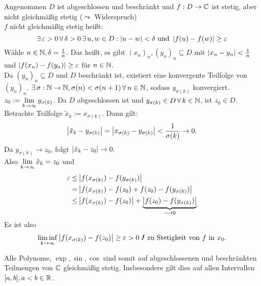 \documentclass[../ana1.tex]{subfiles}
\begin{document}
\begin{bew}
    Angenommen \(D\) ist abgeschlossen und beschränkt und
    \( f: D \rightarrow \mathbb{C} \) ist stetig, aber nicht gleichmäßig
    stetig (\( \leadsto \) Widerspruch)\\
    \( f \) nicht gleichmäßig stetig heißt:
    \[ \exists \, \varepsilon > 0 \,\forall \, 
    \delta > 0 \,\exists \, u, w \in D: \left|u-w\right|
    < \delta \text{ und } \left|f(u) - f(w)\right| \geq \varepsilon \]
    Wähle \( n\in\mathbb{N}, \delta = \frac{1}{n} \). Das heißt, 
    es gibt \( {(x_n)}_n, {(y_n)}_n \subseteq D \) mit 
    \( \left|x_n - y_n\right| < \frac{1}{n} \) und 
    \( \left|f(x_n) - f(y_n)\right| \geq \varepsilon \) für 
    \( n\in\mathbb{N} \).\\
    Da \( {(y_n)}_n \subseteq D \) und \( D \) beschränkt ist,
    existiert eine konvergente Teilfolge von \( {(y_n)}_n \).
    \( \exists \, \sigma : \mathbb{N} \rightarrow \mathbb{N},
    \sigma(n) < \sigma(n+1) \,\forall \, n\in\mathbb{N} \), 
    sodass \( y_{\sigma(k)} \) konvergiert.\\
    \( z_0 := \lim\limits_{k\rightarrow\infty} y_{\sigma(k)} \). Da \(D\) abgeschlossen
    ist und \( y_{\sigma(k)} \in D \,\forall \, k \in\mathbb{N} \), 
    ist \( z_0 \in D \).\\
    Betrachte Teilfolge \( \tilde{x}_k := x_{\sigma(k)} \).
    Dann gilt:
    \[ \left| \tilde{x}_k - y_{\sigma(k)} \right| 
    = \left| x_{\sigma(k)} - y_{\sigma(k)} \right|
    < \frac{1}{\sigma(k)} \rightarrow 0. \]
    Da \( y_{\sigma(k)} \rightarrow z_0 \), folgt 
    \( \left| \tilde{x}_k - z_0 \right| \rightarrow 0. \) \\
    Also \( \lim\limits_{k\rightarrow\infty} \tilde{x}_k = z_0 \) und 
    \begin{align*}
        \varepsilon \leq &\left| f(x_{\sigma(k)}) - f(y_{\sigma(k)}) \right|\\
        = &\left| f(x_{\sigma(k)}) - f(z_0) + f(z_0) - f(y_{\sigma(k)}) \right|\\
        \leq &\left| f(x_{\sigma(k)}) - f(z_0) \right| + \underbrace{\left| f(z_0) - f(y_{\sigma(k)}) \right|}_{\longrightarrow 0}
    \end{align*}
    Es ist also 
    \[ \limesinf{k} \abs{ f(x_{\sigma(k)}) - f(z_0) } \geq \varepsilon > 0 \text{ \Lightning{} zu Stetigkeit von  } f \text{ in } x_0. \]
\end{bew}
\begin{bem}
    Alle Polynome, \( \exp, \sin, \cos \) sind somit
    auf abgeschlossenen und beschränkten Teilmengen
    von \( \mathbb{C} \) gleichmäßig stetig. Insbesondere 
    gilt dies auf allen Intervallen \( [a,b], 
    a<b \in\mathbb{R} \).
\end{bem}
\end{document}
